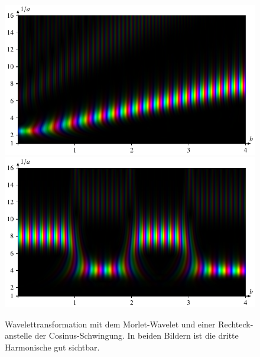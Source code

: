 \begin{figure}
	\centering
	\includegraphics[width=\linewidth, keepaspectratio]{papers/complex/images/add_rs_chirp_morlet.pdf}
	\includegraphics[width=\linewidth, keepaspectratio]{papers/complex/images/add_rs_square_morlet.pdf}
	\caption{Wavelettransformation mit dem Morlet-Wavelet und einer Rechteck- anstelle der Cosinus-Schwingung.
		In beiden Bildern ist die dritte Harmonische gut sichtbar.}
\end{figure}


